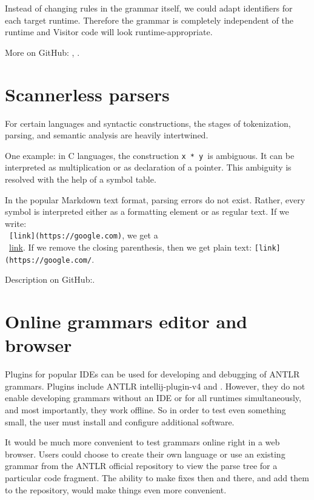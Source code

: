 \documentclass[sigplan,screen]{acmart}
\begin{document}
Instead of changing rules in the grammar itself, we could adapt
identifiers for each target runtime. Therefore the grammar is completely
independent of the runtime and Visitor code will look
runtime-appropriate.

More on GitHub: \cite{naming-convention}, \cite{symbol-conflicts}.

\section{Scannerless parsers}

For certain languages and syntactic constructions, the stages of
tokenization, parsing, and semantic analysis are heavily intertwined.

One example: in C languages, the construction \texttt{x\ *\ y}~is
ambiguous. It can be interpreted as multiplication or as declaration of
a pointer. This ambiguity is resolved with the help of a symbol table.

In the popular Markdown text format, parsing errors do not exist. Rather, every
symbol is interpreted either as a formatting element or as regular text. If we
write: \\~\texttt{{[}link{]}(https://google.com)}, we get
a \\~\href{https://google.com/}{link}. If we remove the closing
parenthesis, then we get plain text:
\texttt{{[}link{]}(https://google.com/}.

Description on GitHub:\cite{scannerless-parser}.

\section{Online grammars editor and browser}

Plugins for popular IDEs can be used for developing and debugging of
ANTLR grammars. Plugins include ANTLR intellij-plugin-v4 \cite{ANTLR-intellij-plugin-v4}
and \cite{vscode-antlr4}. However, they do not enable developing grammars without
an IDE or for all runtimes simultaneously, and most importantly, they work offline.
So in order to test even something small, the user must install and
configure additional software.

It would be much more convenient to test grammars online right in a web
browser. Users could choose to create their own language or use an
existing grammar from the ANTLR official repository \cite{grammars-v4} to view
the parse tree for a particular code fragment. The ability to make fixes then and
there, and add them to the repository, would make things even more convenient.
\end{document}
